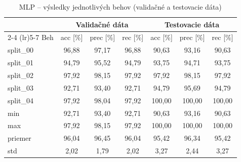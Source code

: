 \begin{table}[H]
    \centering
    \caption{MLP -- výsledky jednotlivých behov (validačné a testovacie dáta)}
    \label{tab:runs-mlp}
    \footnotesize
    \begin{tabular}{lcccccc}
        \toprule
         & \multicolumn{3}{c}{Validačné dáta} & \multicolumn{3}{c}{Testovacie dáta} \\
        \cmidrule(lr){2-4} \cmidrule(lr){5-7}
        Beh & acc [\%] & prec [\%] & rec [\%] & acc [\%] & prec [\%] & rec [\%] \\
        \midrule
        split\_00 & 96,88 & 97,17 & 96,88 & 90,63 & 93,16 & 90,63 \\
        split\_01 & 94,79 & 95,52 & 94,79 & 93,75 & 94,71 & 93,75 \\
        split\_02 & 97,92 & 98,15 & 97,92 & 97,92 & 98,15 & 97,92 \\
        split\_03 & 92,71 & 93,40 & 92,71 & 94,79 & 95,69 & 94,79 \\
        split\_04 & 97,92 & 98,04 & 97,92 & 100,00 & 100,00 & 100,00 \\
        \midrule
        min & 92,71 & 93,40 & 92,71 & 90,63 & 93,16 & 90,63 \\
        max & 97,92 & 98,15 & 97,92 & 100,00 & 100,00 & 100,00 \\
        priemer & 96,04 & 96,45 & 96,04 & 95,42 & 96,34 & 95,42 \\
        std & 2,02 & 1,79 & 2,02 & 3,27 & 2,44 & 3,27 \\
        \bottomrule
    \end{tabular}
\end{table}
